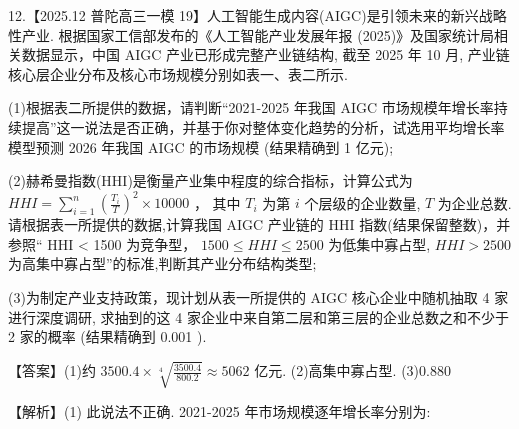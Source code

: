 \documentclass[10pt]{article}
\begin{document}
12.【2025.12 普陀高三一模 19】人工智能生成内容(AIGC)是引领未来的新兴战略性产业. 根据国家工信部发布的《人工智能产业发展年报 (2025)》及国家统计局相关数据显示，中国 AIGC 产业已形成完整产业链结构, 截至 2025 年 10 月, 产业链核心层企业分布及核心市场规模分别如表一、表二所示.

\begin{center}
\end{center}

(1)根据表二所提供的数据，请判断“2021-2025 年我国 AIGC 市场规模年增长率持续提高”这一说法是否正确，并基于你对整体变化趋势的分析，试选用平均增长率模型预测 2026 年我国 AIGC 的市场规模 (结果精确到 1 亿元);

(2)赫希曼指数(HHI)是衡量产业集中程度的综合指标，计算公式为 \({HHI} = \mathop{\sum }\limits_{{i = 1}}^{n}{\left( \frac{{T}_{i}}{T}\right) }^{2} \times  {10000}\) ， 其中 \({T}_{i}\) 为第 \(i\) 个层级的企业数量, \(T\) 为企业总数.请根据表一所提供的数据,计算我国 AIGC 产业链的 HHI 指数(结果保留整数)，并参照“ HHI < 1500 为竞争型， \({1500} \leq  {HHI} \leq  {2500}\) 为低集中寡占型, \({HHI} > {2500}\) 为高集中寡占型”的标准,判断其产业分布结构类型;

(3)为制定产业支持政策，现计划从表一所提供的 AIGC 核心企业中随机抽取 4 家进行深度调研, 求抽到的这 4 家企业中来自第二层和第三层的企业总数之和不少于 2 家的概率 (结果精确到 0.001 ).

【答案】(1)约 \({3500.4} \times  \sqrt[4]{\frac{3500.4}{800.2}} \approx  {5062}\) 亿元. (2)高集中寡占型. (3)0.880

【解析】(1) 此说法不正确. 2021-2025 年市场规模逐年增长率分别为:
\end{document}
